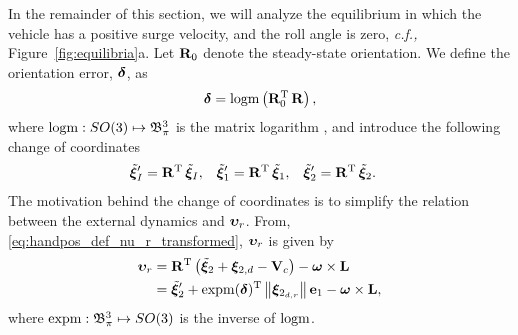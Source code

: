 In the remainder of this section, we will analyze the equilibrium in which the vehicle has a positive surge velocity, and the roll angle is zero, \emph{c.f.,} Figure~\ref{fig:equilibria}a.
Let $\mat{R}_0$ denote the steady-state orientation.
We define the orientation error, $\bs{\delta}$, as
\begin{equation}
    \bs{\delta} = {\rm logm}\left(\mat{R}_0\T\,\mat{R}\right),
    \label{eq:handpos_trajectory_delta}
\end{equation}
where ${\rm logm}: SO(3) \mapsto \ball[3]{\pi}$ is the matrix logarithm \cite{iserles_lie_2000}, and introduce the following change of coordinates
\begin{align}
    \tilde{\bs{\xi}}_I^{\prime} &= \mathbf{R}\T\,\tilde{\bs{\xi}}_I, &
    \tilde{\bs{\xi}}_1^{\prime} &= \mathbf{R}\T\,\tilde{\bs{\xi}}_1, &
    \tilde{\bs{\xi}}_2^{\prime} &= \mathbf{R}\T\,\tilde{\bs{\xi}}_2.
\end{align}
The motivation behind the change of coordinates is to simplify the relation between the external dynamics and $\bvel_r$.
From, \eqref{eq:handpos_def_nu_r_transformed}, $\bvel_r$ is given by
\begin{equation}
    \begin{split}
    \bvel_r &= \mathbf{R}\T\left(\tilde{\bs{\xi}}_2 + \bs{\xi}_{2, d} - \ocean\right) - \bs{\omega} \times \mat{L} \\
        &= \tilde{\bs{\xi}}_2^{\prime} + {\rm expm}(\bs{\delta})\T \norm{\bs{\xi}_{2_{d,r}}}\mat{e}_1 - \bs{\omega} \times \mat{L},
    \end{split}
\end{equation}
where ${\rm expm}: \ball[3]{\pi} \mapsto SO(3)$ is the inverse of ${\rm logm}$.

